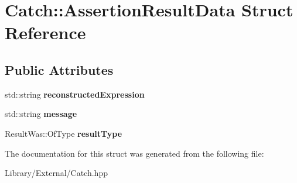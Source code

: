 \hypertarget{struct_catch_1_1_assertion_result_data}{}\section{Catch\+:\+:Assertion\+Result\+Data Struct Reference}
\label{struct_catch_1_1_assertion_result_data}
\subsection*{Public Attributes}
\begin{DoxyCompactItemize}
\item 
\hypertarget{struct_catch_1_1_assertion_result_data_a9e809d36fffbeb1c7d0cbe7382dd9595}{}std\+::string {\bfseries reconstructed\+Expression}\label{struct_catch_1_1_assertion_result_data_a9e809d36fffbeb1c7d0cbe7382dd9595}

\item 
\hypertarget{struct_catch_1_1_assertion_result_data_ac34215803c4c4a88f795879f61c1f7b4}{}std\+::string {\bfseries message}\label{struct_catch_1_1_assertion_result_data_ac34215803c4c4a88f795879f61c1f7b4}

\item 
\hypertarget{struct_catch_1_1_assertion_result_data_a7ceab4a7ff722aec5587e3748caf66b7}{}Result\+Was\+::\+Of\+Type {\bfseries result\+Type}\label{struct_catch_1_1_assertion_result_data_a7ceab4a7ff722aec5587e3748caf66b7}

\end{DoxyCompactItemize}


The documentation for this struct was generated from the following file\+:\begin{DoxyCompactItemize}
\item 
Library/\+External/Catch.\+hpp\end{DoxyCompactItemize}
